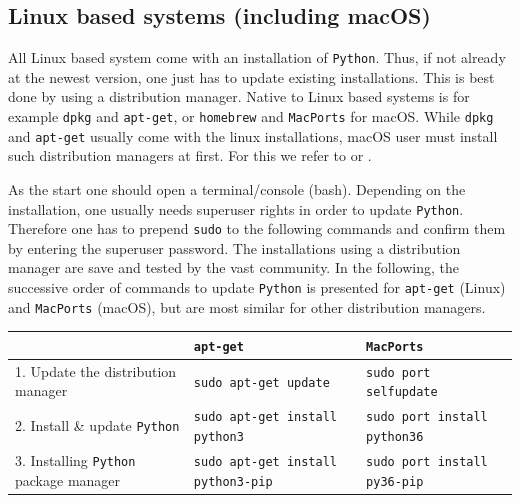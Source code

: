 \documentclass[12pt,ngerman,american]{iopart}
\newcommand{\python}[0]{\texttt{Python}}
\newcommand{\code}[1]{{\scriptsize\colorbox{light-gray}{\texttt{#1}}}}
\begin{document}
\subsection{Linux based systems (including macOS)}\label{appendix:python-max}
All Linux based system come with an installation of \python{}.
Thus, if not already at the newest version, one just has to update existing installations.
This is best done by using a distribution manager.
Native to Linux based systems is for example \texttt{dpkg} and \texttt{apt-get}, or \texttt{homebrew} and \texttt{MacPorts} for macOS.
While \texttt{dpkg} and \texttt{apt-get} usually come with the linux installations, macOS user must install such distribution managers at first.
For this we refer to \cite{MacPorts} or \cite{Homebrew}.

As the start one should open a terminal/console (bash).
Depending on the installation, one usually needs superuser rights in order to update \python{}.
Therefore one has to prepend \code{sudo} to the following commands and confirm them by entering the superuser password.
The installations using a distribution manager are save and tested by the vast community.
In the following, the successive order of commands to update \python{} is presented for \texttt{apt-get} (Linux) and \texttt{MacPorts} (macOS), but are most similar for other distribution managers.
\begin{table}[h!]
\centering
\footnotesize
\begin{tabular}{l || l | l}
	& \texttt{apt-get} & \texttt{MacPorts} \\\hline
	1. Update the distribution manager & \code{sudo apt-get update} & \code{sudo port selfupdate} \\
	2. Install \& update \python{} & \code{sudo apt-get install python3} & \code{sudo port install python36} \\
	3. Installing \python{} package manager & \code{sudo apt-get install python3-pip} & \code{sudo port install py36-pip}
\end{tabular}
\normalsize
\end{table}
\end{document}
